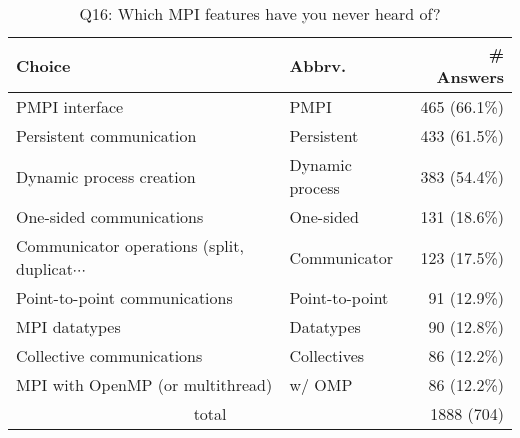 \begin{table}[htb]%
\begin{center}%
\caption{Q16: Which MPI features have you never heard of?}%
\label{tab:Q16-ans}%
\begin{tabular}{l|l|r}%
\hline%
Choice & Abbrv. & \# Answers \\%
\hline%
PMPI interface & PMPI & 465 (66.1\%) \\%
Persistent communication & Persistent & 433 (61.5\%) \\%
Dynamic process creation & Dynamic process & 383 (54.4\%) \\%
One-sided communications & One-sided & 131 (18.6\%) \\%
{\small Communicator operations (split, duplicat$\cdots$} & Communicator & 123 (17.5\%) \\%
Point-to-point communications & Point-to-point & 91 (12.9\%) \\%
MPI datatypes & Datatypes & 90 (12.8\%) \\%
Collective communications & Collectives & 86 (12.2\%) \\%
MPI with OpenMP (or multithread) & w/ OMP & 86 (12.2\%) \\%
\hline%
\multicolumn{2}{c}{total} & 1888 (704)\\%
\hline%
\end{tabular}%
\end{center}%
\end{table}%
